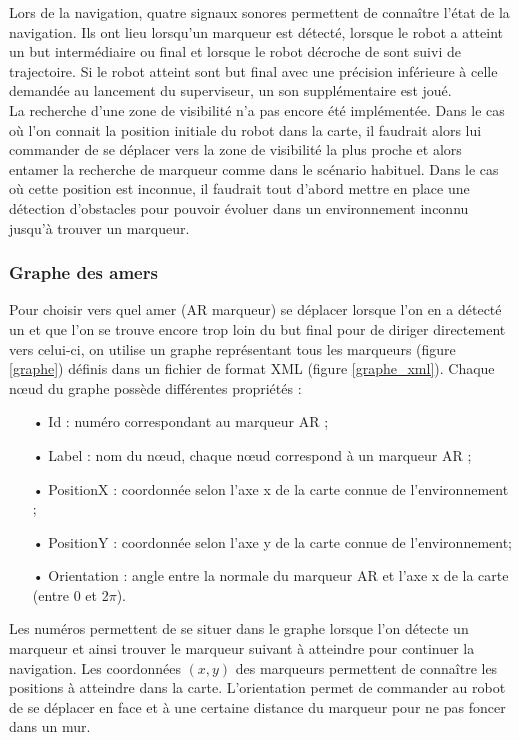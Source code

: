 \documentclass[10pt,a4paper]{article}
\begin{document}
Lors de la navigation, quatre signaux sonores permettent de connaître l'état de la navigation. Ils ont lieu lorsqu'un marqueur est détecté, lorsque le robot a atteint un but intermédiaire ou final et lorsque le robot décroche de sont suivi de trajectoire. Si le robot atteint sont but final avec une précision inférieure à celle demandée au lancement du superviseur, un son supplémentaire est joué.\\

La recherche d'une zone de visibilité n'a pas encore été implémentée. Dans le cas où l'on connait la position initiale du robot dans la carte, il faudrait alors lui commander de se déplacer vers la zone de visibilité la plus proche et alors entamer la recherche de marqueur comme dans le scénario habituel. Dans le cas où cette position est inconnue, il faudrait tout d'abord mettre en place une détection d'obstacles pour pouvoir évoluer dans un environnement inconnu jusqu'à trouver un marqueur.

\subsubsection{Graphe des amers}
\label{sec:grapheDesAmers}

Pour choisir vers quel amer (AR marqueur) se déplacer lorsque l'on en a détecté un et que l'on se trouve encore trop loin du but final pour de diriger directement vers celui-ci, on utilise un graphe représentant tous les marqueurs (figure \ref{graphe}) définis dans un fichier de format XML (figure \ref{graphe_xml}). Chaque nœud du graphe possède différentes propriétés : 

\begin{itemize}
\item[•] Id : numéro correspondant au marqueur AR ; 
\item[•] Label : nom du nœud, chaque nœud correspond à un marqueur AR ; 
\item[•] PositionX : coordonnée selon l'axe x de la carte connue de l'environnement ; 
\item[•] PositionY : coordonnée selon l'axe y de la carte connue de l'environnement; 
\item[•] Orientation : angle entre la normale du marqueur AR et l'axe x de la carte (entre 0 et 2$\pi$).
\end{itemize}

Les numéros permettent de se situer dans le graphe lorsque l'on détecte un marqueur et ainsi trouver le marqueur suivant à atteindre pour continuer la navigation. Les coordonnées $(x,y)$ des marqueurs permettent de connaître les positions à atteindre dans la carte. L'orientation permet de commander au robot de se déplacer en face et à une certaine distance du marqueur pour ne pas foncer dans un mur.
\end{document}

